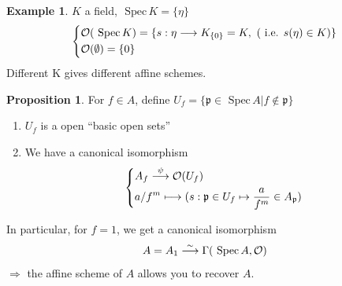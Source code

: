 \documentclass[11pt]{article}
\theoremstyle{definition}
\newtheorem{prop}[thm]{Proposition}
\newtheorem{ex}[thm]{Example}
\newcommand{\spec}{\text{ Spec}\,}
\newcommand{\scp}{{\mathfrak p}}
\newcommand{\calo}{{\cal O}}
\newcommand{\Lrta}{\Longrightarrow}
\newcommand{\lrta}{\longrightarrow}
\begin{document}
\begin{ex}
$K$ a field, $\spec K=\{\eta\}$
$$
\left\{
\begin{aligned}
&\calo(\spec K)=\{s:\eta\lrta K_{\{0\}}=K,\ (\text{ i.e. } s(\eta)\in K)\} \\
&\calo(\emptyset)=\{0\}
\end{aligned}
\right.
$$
Different K gives different affine schemes.
\end{ex}

\begin{prop}
For $f\in A$, define $U_f=\{\scp\in \spec A|f\notin \scp\}$
\begin{enumerate}[label=(\arabic*)]
	\item $U_f$ is a open ``basic open sets''
	\item We have a canonical isomorphism
	$$
	\left\{
	\begin{aligned}
	& A_f\overset{\psi}{\lrta}\calo(U_f)\\
	& a/f^m\longmapsto (s:\scp\in U_f\mapsto \frac{a}{f^m}\in A_\scp)
	\end{aligned}
	\right.
	$$
\end{enumerate}
In particular, for $f=1$, we get a canonical isomorphism
$$
A=A_1\overset{\sim}{\lrta}\Gamma(\spec A,\calo)
$$
$\Lrta$ the affine scheme of $A$ allows you to recover $A$.
\end{prop}
\end{document}
